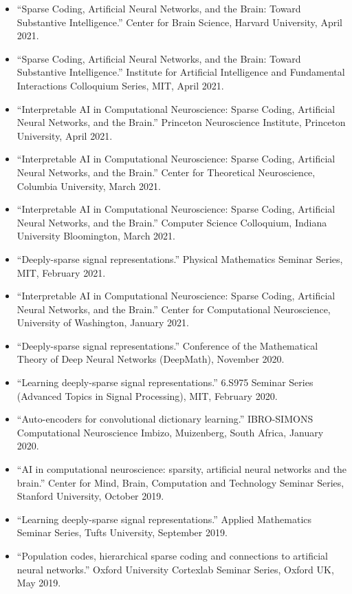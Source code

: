 \begin{itemize}
	\item ``Sparse Coding, Artificial Neural Networks, and the Brain: Toward Substantive Intelligence.'' Center for Brain Science, Harvard University, April 2021.
	\item ``Sparse Coding, Artificial Neural Networks, and the Brain: Toward Substantive Intelligence.'' Institute for Artificial Intelligence and Fundamental Interactions Colloquium Series, MIT, April 2021.
	\item ``Interpretable AI in Computational Neuroscience: Sparse Coding, Artificial Neural Networks, and the Brain.'' Princeton Neuroscience Institute, Princeton University, April 2021.
	\item ``Interpretable AI in Computational Neuroscience: Sparse Coding, Artificial Neural Networks, and the Brain.'' Center for Theoretical Neuroscience, Columbia University, March 2021.
	\item ``Interpretable AI in Computational Neuroscience: Sparse Coding, Artificial Neural Networks, and the Brain.'' Computer Science Colloquium, Indiana University Bloomington, March 2021.
	\item ``Deeply-sparse signal representations.'' Physical Mathematics Seminar Series, MIT, February 2021.
	\item ``Interpretable AI in Computational Neuroscience: Sparse Coding, Artificial Neural Networks, and the Brain.'' Center for Computational Neuroscience, University of Washington, January 2021.
	\item ``Deeply-sparse signal representations.'' Conference of the Mathematical Theory of Deep Neural Networks (DeepMath), November 2020.
	\item ``Learning deeply-sparse signal representations.''  6.S975 Seminar Series (Advanced Topics in Signal Processing), MIT, February 2020.
	\item ``Auto-encoders for convolutional dictionary learning.'' IBRO-SIMONS Computational Neuroscience Imbizo, Muizenberg, South Africa, January 2020.	
	\item ``AI in computational neuroscience: sparsity, artificial neural networks and the brain.'' Center for Mind, Brain, Computation and Technology Seminar Series, Stanford University, October 2019.
	\item ``Learning deeply-sparse signal representations.''  Applied Mathematics Seminar Series, Tufts University, September 2019.	
	\item ``Population codes, hierarchical sparse coding and connections to artificial neural networks.''  Oxford University Cortexlab Seminar Series, Oxford UK, May 2019.

\end{itemize}
